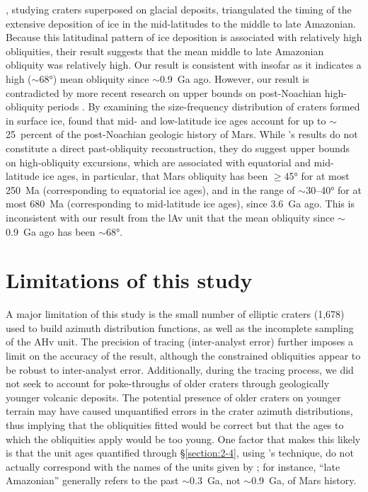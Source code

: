 \documentclass{ucetd}
\begin{document}
\citet{fassett2014a}, studying craters superposed on glacial deposits, triangulated the timing of the extensive deposition of ice in the mid-latitudes to the middle to late Amazonian. Because this latitudinal pattern of ice deposition is associated with relatively high obliquities, their result suggests that the mean middle to late Amazonian obliquity was relatively high. Our result is consistent with \citet{fassett2014a} insofar as it indicates a high ($\sim$68°) mean obliquity since $\sim$0.9~Ga ago. However, our result is contradicted by more recent research on upper bounds on post-Noachian high-obliquity periods \citep{weiss2019a}. By examining the size-frequency distribution of craters formed in surface ice, \citet{weiss2019a} found that mid- and low-latitude ice ages account for up to $\sim$25~percent of the post-Noachian geologic history of Mars. While \citet{weiss2019a}’s results do not constitute a direct past-obliquity reconstruction, they do suggest upper bounds on high-obliquity excursions, which are associated with equatorial and mid-latitude ice ages, in particular, that Mars obliquity has been $\ge$45° for at most 250~Ma (corresponding to equatorial ice ages), and in the range of $\sim$30--40° for at most 680~Ma (corresponding to mid-latitude ice ages), since 3.6~Ga ago. This is inconsistent with our result from the lAv unit that the mean obliquity since $\sim$0.9~Ga ago has been $\sim$68°.

\section{Limitations of this study}
\label{section:4-5}

A major limitation of this study is the small number of elliptic craters (1,678) used to build azimuth distribution functions, as well as the incomplete sampling of the AHv unit. The precision of tracing (inter-analyst error) further imposes a limit on the accuracy of the result, although the constrained obliquities appear to be robust to inter-analyst error. Additionally, during the tracing process, we did not seek to account for poke-throughs of older craters through geologically younger volcanic deposits. The potential presence of older craters on younger terrain may have caused unquantified errors in the crater azimuth distributions, thus implying that the obliquities fitted would be correct but that the ages to which the obliquities apply would be too young. One factor that makes this likely is that the unit ages quantified through §\ref{section:2-4}, using \citet{michael2013a}’s technique, do not actually correspond with the names of the units given by \citet{tanaka2014a}; for instance, ``late Amazonian'' generally refers to the past $\sim$0.3~Ga, not $\sim$0.9~Ga, of Mars history.
\end{document}
